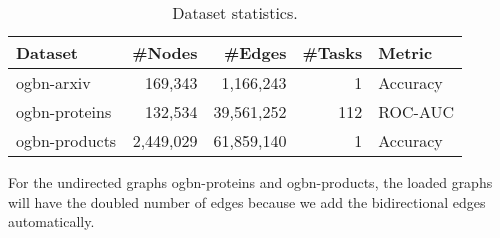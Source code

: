 \documentclass[conference]{IEEEtran}
\begin{document}
\begin{table}
  \caption{Dataset statistics.}
  \label{dataset-stats}
  \centering
  \begin{threeparttable}
  \begin{tabular}{lrrrl}
    \toprule
    Dataset     & \#Nodes     & \#Edges   & \#Tasks   & Metric \\
    \midrule
    ogbn-arxiv  & 169,343 	& 1,166,243 & 1 & Accuracy \\
    ogbn-proteins & 132,534  &	39,561,252 	& 112 & ROC-AUC \\
    ogbn-products & 2,449,029  &	61,859,140 	& 1 & Accuracy\\
    \bottomrule
  \end{tabular}
  \begin{tablenotes}
    \item For the undirected graphs ogbn-proteins and ogbn-products, the loaded graphs will have the doubled number of edges because we add the bidirectional edges automatically.
  \end{tablenotes}
  \end{threeparttable}
\end{table}
\end{document}
